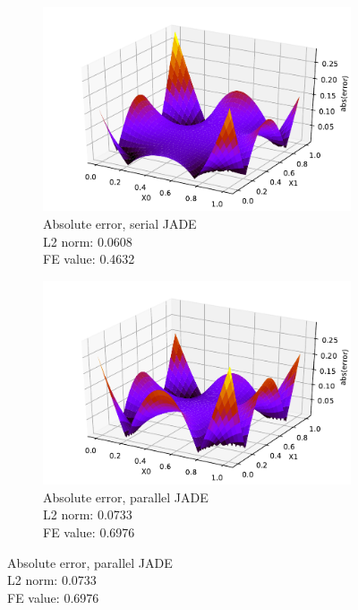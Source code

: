 \documentclass[./\jobname.tex]{subfiles}
\begin{document}
\begin{figure}[h]
	\centering
	\begin{subfigure}[b]{0.5\linewidth}
		\centering
		\includegraphics[width=1\textwidth]{../../code/experiments/experiment_1/abs_error_pde4_serial.pdf}
		\caption{Absolute error, serial JADE \\ L2 norm: 0.0608 \\ FE value: 0.4632}
		\label{fig:serial_JADE_pde4_abs_error}
	\end{subfigure}%
	\begin{subfigure}[b]{0.5\linewidth}
		\centering
		\includegraphics[width=1\textwidth]{../../code/experiments/experiment_1/abs_error_pde4_parallel.pdf}
		\caption{Absolute error, parallel JADE \\ L2 norm: 0.0733 \\ FE value: 0.6976}
		\label{fig:parallel_JADE_pde4_abs_error}
	\end{subfigure}%
	\label{fig:serial_parallel_pde4_error_comparison}
\end{figure}
\end{document}
